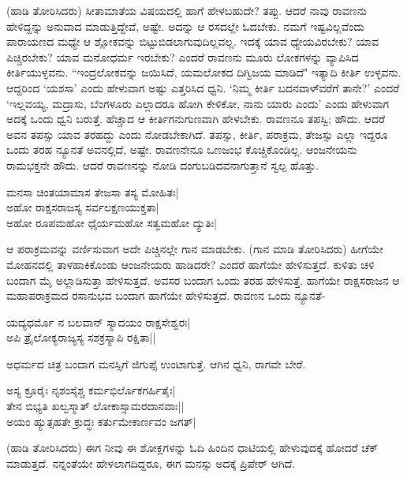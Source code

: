 (ಹಾಡಿ ತೋರಿಸಿದರು) ಸೀತಾಮಾತೆಯ ವಿಷಯದಲ್ಲಿ ಹಾಗೆ ಹೇಳಬಹುದೇ? ತಪ್ಪು. ಆದರೆ ನಾವು ರಾವಣನು ಹೇಳಿದ್ದನ್ನು ಅನುವಾದ ಮಾಡುತ್ತಿದ್ದೇವೆ, ಅಷ್ಟೇ. ಅದನ್ನು ಆ ರಸದಲ್ಲೇ ಓದಬೇಕು. ನಮಗೆ ಇಷ್ಟವಿಲ್ಲವೆಂದು ಪಾರಾಯಣದ ಮಧ್ಯೇ ಆ ಶ್ಲೋಕವನ್ನು ಬಿಟ್ಟುಬಿಡಲಾಗುವುದಿಲ್ಲವಲ್ಲ. ಇದಕ್ಕೆ ಯಾವ ಧ್ಯೇಯವಿರಬೇಕು? ಯಾವ ಪಿಚ್ಚಿರಬೇಕು? ಯಾವ ಮನೋಧರ್ಮ ಇರಬೇಕು? ಎಂದರೆ ರಾವಣನು ಮೂರು ಲೋಕಗಳನ್ನು ವ್ಯಾಪಿಸಿದ ಕೀರ್ತಿಯುಳ್ಳವನು. ``ಇಂದ್ರಲೋಕವನ್ನು ಜಯಿಸಿದೆ, ಯಮಲೋಕದ ದಿಗ್ವಿಜಯ ಮಾಡಿದೆ" ಇತ್ಯಾದಿ ಕೀರ್ತಿ ಉಳ್ಳವನು. ಆದ್ದರಿಂದ `ಯಶಸಾ' ಎಂದು ಹೇಳುವಾಗ ಅಷ್ಟು ಎತ್ತರಿಸಿದ ಧ್ವನಿ. `ನಿಮ್ಮ ಕೀರ್ತಿ ಬದನವಾಳ್‍ವರೆಗೆ ತಾನೇ?' ಎಂದರೆ `ಇಲ್ಲವಯ್ಯ, ಮದ್ರಾಸು, ಬೆಂಗಳೂರು ಎಲ್ಲಾದರೂ ಹೋಗಿ ಕೇಳಿಕೋ, ನಾನು ಯಾರು ಎಂದು' ಎಂದು ಹೇಳುವಾಗ ಅದಕ್ಕೆ ಒಂದು ಧ್ವನಿ ಬರುತ್ತೆ. ಹೆಚ್ಚಾದ ಆ ಕೀರ್ತಿಗನುಗುಣವಾಗಿ ಹೇಳಬೇಕು. ರಾವಣನೂ ತಪಸ್ವಿ; ಹೌದು. ಆದರೆ ಅವನ ತಪಸ್ಸು ಯಾವ ತರಹದ್ದು ಎಂದು ನೋಡಬೇಕಾಗಿದೆ. ತಪಸ್ಸು, ಕೀರ್ತಿ, ಪರಾಕ್ರಮ, ತೇಜಸ್ಸು ಎಲ್ಲಾ ಇದ್ದರೂ ಒಂದು ತರಹ ನ್ಯೂನತೆ ಅವನಲ್ಲಿದೆ, ಅಷ್ಟೇ. ರಾವಣನೇನೂ ಒಣಜಂಭ ಕೊಚ್ಚಿಕೊಂಡಿಲ್ಲ. ಆಂಜನೇಯನು ರಾಮಭಕ್ತನೇ ಹೌದು. ಆದರೆ ರಾವಣನನ್ನು ನೋಡಿ ದಂಗುಬಡಿದವನಾಗುತ್ತಾನೆ ಸ್ವಲ್ಪ ಹೊತ್ತು. 

\begin{shloka} 
ಮನಸಾ ಚಿಂತಯಾಮಾಸ ತೇಜಸಾ ತಸ್ಯ ಮೋಹಿತಃ|\\ 
ಅಹೋ ರಾಕ್ಷಸರಾಜಸ್ಯ ಸರ್ವಲಕ್ಷಣಯುಕ್ತತಾ|\\ 
ಅಹೋ ರೂಪಮಹೋ ಧೈರ್ಯಮಹೋ ಸತ್ವಮಹೋ ದ್ಯುತಿಃ|
\end{shloka}

ಆ ಪರಾಕ್ರಮವನ್ನು ವರ್ಣಿಸುವಾಗ ಅದೇ ಪಿಚ್ಚಿನಲ್ಲೇ ಗಾನ ಮಾಡಬೇಕು. (ಗಾನ ಮಾಡಿ ತೋರಿಸಿದರು) ಹೀಗೆಯೇ ಮೋಹನದಲ್ಲಿ ತಾಳಹಾಕಿಕೊಂಡು ಆಂಜನೇಯರು ಹಾಡಿದರೇ? ಎಂದರೆ ಹಾಗೆಯೇ ಹೇಳಿಸುತ್ತದೆ. ಕುಳಿತು ಚಳಿ ಬಂದಾಗ ಮೈ ಅಲ್ಲಾಡಿಸುತ್ತಾ ಹೇಳಿಸುತ್ತದೆ. ಅವಸರ ಬಂದಾಗ ಒಂದು ತರಹ ಹೇಳಿಸುತ್ತೆ. ಹಾಗೆಯೇ ರಾಕ್ಷಸರಾಜನ ಆ ಮಹಾಪರಾಕ್ರಮದ ರಸಾನುಭವ ಬಂದಾಗ ಹಾಗೆಯೇ ಹೇಳಿಸುತ್ತದೆ. ರಾವಣನ ಒಂದು ನ್ಯೂನತೆ- 

\begin{shloka} 
ಯದ್ಯಧರ್ಮೊ ನ ಬಲವಾನ್‍ ಸ್ಯಾದಯಂ ರಾಕ್ಷಸೇಶ್ವರಃ|\\ 
ಅಪಿ ತ್ರೈಲೋಕ್ಯರಾಜ್ಯಸ್ಯ ಸಶಕ್ರಸ್ಯಾಪಿ ರಕ್ಷಿತಾ||
\end{shloka}

ಅಧರ್ಮದ ಚಿತ್ರ ಬಂದಾಗ ಮನಸ್ಸಿಗೆ ಜಿಗುಪ್ಸೆ ಉಂಟಾಗುತ್ತೆ. ಆಗಿನ ಧ್ವನಿ, ರಾಗವೇ ಬೇರೆ. 

\begin{shloka}
ಅಸ್ಯ ಕ್ರೂರೈಃ ನೃಶಂಸೈಶ್ಚ ಕರ್ಮಭಿರ್ಲೊಕಗರ್ಹಿತೈಃ|\\ 
ತೇನ ಬಿಭ್ಯತಿ ಖಲ್ವಸ್ಮಾತ್‍ ಲೋಕಾಸ್ಸಾಮರದಾನವಾಃ||\\ 
ಅಯಂ ಹ್ಯುತ್ಸಹತೇ ಕ್ರುದ್ಧಃ ಕರ್ತುಮೇಕಾರ್ಣವಂ ಜಗತ್‍|
\end{shloka}


(ಹಾಡಿ ತೋರಿಸಿದರು) ಈಗ ನೀವು ಈ ಶೋಕ್ಲಗಳನ್ನು ಓದಿ ಹಿಂದಿನ ಧಾಟಿಯಲ್ಲಿ ಹೇಳುವುದಕ್ಕೆ ಹೋದರೆ ಚೆಕ್‍ ಮಾಡುತ್ತದೆ. ನನ್ನಂತೆಯೇ ಹೇಳಲಾಗದಿದ್ದರೂ, ಈಗ ಮನಸ್ಸು ಅದಕ್ಕೆ ಪ್ರಿಪೇರ್‍ ಆಗಿದೆ. 

